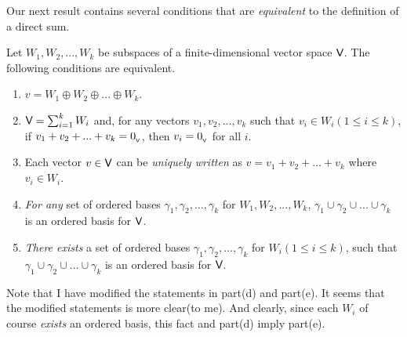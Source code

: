 Our next result contains several conditions that are \emph{equivalent} to the definition of a direct sum.

\begin{theorem} \label{thm 5.9}
Let \(W_1, W_2, ..., W_k\) be subspaces of a finite-dimensional vector space \(\textsf{V}\).
The following conditions are equivalent.

\begin{enumerate}
\item \(v = W_1 \oplus W_2 \oplus ... \oplus W_k\).
\item \(\textsf{V} = \sum_{i = 1}^k W_i\) and, for any vectors \(v_1, v_2, ..., v_k\) such that \(v_i \in W_i
(1 \le i \le k)\), if \(v_1 + v_2 + ... + v_k = 0_{_{\textsf{V}}}\), then \(v_i = 0_{_{\textsf{V}}}\) for all \(i\).
\item Each vector \(v \in \textsf{V}\) can be \emph{uniquely written} as \(v = v_1 + v_2 + ... + v_k\) where \(v_i \in W_i\).
\item\RED{*} \emph{For any} set of ordered bases \(\gamma_1, \gamma_2, ..., \gamma_k\) for \(W_1, W_2, ..., W_k\), \(\gamma_1 \cup \gamma_2 \cup ... \cup \gamma_k\) is an ordered basis for \(\textsf{V}\).
\item\RED{**} \emph{There exists} a set of ordered bases \(\gamma_1, \gamma_2, ..., \gamma_k\) for \(W_i (1 \le i \le k)\), such that \(\gamma_1 \cup \gamma_2 \cup ... \cup \gamma_k\) is an ordered basis for \(\textsf{V}\).
\end{enumerate}
\end{theorem}

\begin{remark} \label{remark 5.2.8}
Note that I have modified the statements in part(d) and part(e).
It seems that the modified statements is more clear(to me).
And clearly, since each \(W_i\) of course \emph{exists} an ordered basis, this fact and part(d) imply part(e).
\end{remark}


